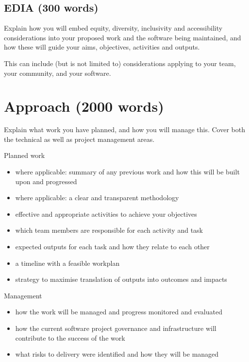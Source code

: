 \documentclass[12pt]{article}
\newenvironment{instruction}{%
    \begin{tcolorbox}[colback=red!5,colframe=red,title=Instruction]%
}{%
    \end{tcolorbox}%
}
\begin{document}


\subsection{EDIA (300 words)}

\begin{instruction}
Explain how you will embed equity, diversity, inclusivity and accessibility considerations into your proposed work and the software being maintained, and how these will guide your aims, objectives, activities and outputs.

This can include (but is not limited to) considerations applying to your team, your community, and your software.
\end{instruction}

\pagebreak



\section{Approach (2000 words)}

\begin{instruction}

Explain what work you have planned, and how you will manage this. Cover both the technical as well as project management areas.

Planned work

    \begin{itemize}
        \item where applicable: summary of any previous work and how this will be built upon and progressed
        \item where applicable: a clear and transparent methodology
        \item effective and appropriate activities to achieve your objectives
        \item which team members are responsible for each activity and task
        \item expected outputs for each task and how they relate to each other
        \item a timeline with a feasible workplan
        \item strategy to maximise translation of outputs into outcomes and impacts
    \end{itemize}

Management

    \begin{itemize}
        \item how the work will be managed and progress monitored and evaluated
        \item how the current software project governance and infrastructure will contribute to the success of the work
        \item what risks to delivery were identified and how they will be managed
    \end{itemize}


\end{instruction}
\end{document}
